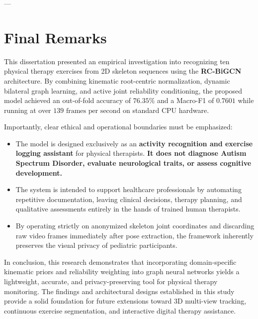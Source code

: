 ---

\section{Final Remarks}

This dissertation presented an empirical investigation into recognizing ten physical therapy exercises from 2D skeleton sequences using the \textbf{RC-BiGCN} architecture. By combining kinematic root-centric normalization, dynamic bilateral graph learning, and active joint reliability conditioning, the proposed model achieved an out-of-fold accuracy of $76.35\%$ and a Macro-F1 of $0.7601$ while running at over $139\text{ frames per second}$ on standard CPU hardware. 

Importantly, clear ethical and operational boundaries must be emphasized:
\begin{itemize}
    \item The model is designed exclusively as an \textbf{activity recognition and exercise logging assistant} for physical therapists. \textbf{It does not diagnose Autism Spectrum Disorder, evaluate neurological traits, or assess cognitive development.}
    \item The system is intended to support healthcare professionals by automating repetitive documentation, leaving clinical decisions, therapy planning, and qualitative assessments entirely in the hands of trained human therapists.
    \item By operating strictly on anonymized skeleton joint coordinates and discarding raw video frames immediately after pose extraction, the framework inherently preserves the visual privacy of pediatric participants.
\end{itemize}

In conclusion, this research demonstrates that incorporating domain-specific kinematic priors and reliability weighting into graph neural networks yields a lightweight, accurate, and privacy-preserving tool for physical therapy monitoring. The findings and architectural designs established in this study provide a solid foundation for future extensions toward 3D multi-view tracking, continuous exercise segmentation, and interactive digital therapy assistance.
